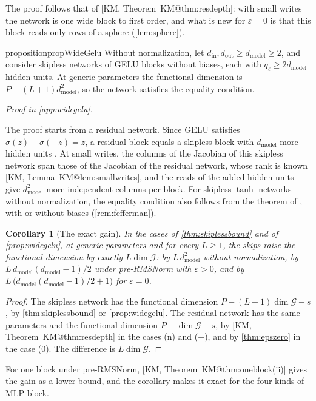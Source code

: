 \documentclass[10pt]{article}
\makeatletter
\newtheorem{corollary}[theorem]{Corollary}
\theoremstyle{definition}
\theoremstyle{remark}
\newcommand{\dm}{d_{\mathrm{model}}}
\newcommand{\G}{\mathcal{G}}
\newcommand{\proofin}[1]{\par\vspace{-0.4\baselineskip}\noindent\hfill{\small\itshape Proof in \cref{#1}.}\par\smallskip}
\newcommand{\KMn}[1]{\csname KM@#1\endcsname}
\newcommand{\KM}[2]{[KM, #1~\KMn{#2}]}
\newcommand{\KMp}[3]{[KM, #1~\KMn{#2}(#3)]}
\makeatother
\begin{document}
The proof follows that of \KM{Theorem}{thm:resdepth}: with small writes the network is one wide block to first order, and what is new for $\varepsilon = 0$ is that this block reads only rows of a sphere (\cref{lem:sphere}).

\begin{restatable}{proposition}{propWideGelu}\label{prop:widegelu}
Without normalization, let $d_{\mathrm{in}}, d_{\mathrm{out}} \ge \dm \ge 2$, and consider skipless networks of GELU blocks without biases, each with $q_\ell \ge 2\dm$ hidden units. At generic parameters the functional dimension is $P - (L+1)\dm^2$, so the network satisfies the equality condition.
\end{restatable}
\proofin{app:widegelu}

The proof starts from a residual network. Since GELU satisfies $\sigma(z) - \sigma(-z) = z$, a residual block equals a skipless block with $\dm$ more hidden units \citep{mijoski2026worth}. At small writes, the columns of the Jacobian of this skipless network span those of the Jacobian of the residual network, whose rank is known \KM{Lemma}{lem:smallwrites}, and the reads of the added hidden units give $\dm^2$ more independent columns per block. For skipless $\tanh$ networks without normalization, the equality condition also follows from the theorem of \citet{fefferman1994}, with or without biases (\cref{rem:fefferman}).

\begin{corollary}[The exact gain]\label{cor:exactgain}
In the cases of \cref{thm:skiplessbound} and of \cref{prop:widegelu}, at generic parameters and for every $L \ge 1$, the skips raise the functional dimension by exactly $L\dim\G$: by $L\,\dm^2$ without normalization, by $L\,\dm(\dm-1)/2$ under pre-RMSNorm with $\varepsilon > 0$, and by $L\,\big(\dm(\dm-1)/2 + 1\big)$ for $\varepsilon = 0$.
\end{corollary}

\begin{proof}
The skipless network has the functional dimension $P - (L+1)\dim\G - s$, by \cref{thm:skiplessbound} or \cref{prop:widegelu}. The residual network has the same parameters and the functional dimension $P - \dim\G - s$, by \KM{Theorem}{thm:resdepth} in the cases (n) and (+), and by \cref{thm:epszero} in the case (0). The difference is $L\dim\G$.
\end{proof}

For one block under pre-RMSNorm, \KMp{Theorem}{thm:oneblock}{ii} gives the gain as a lower bound, and the corollary makes it exact for the four kinds of MLP block.
\end{document}
